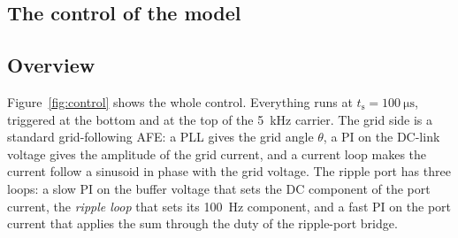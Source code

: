 \documentclass[11pt,a4paper]{scrartcl}
\newcommand{\ped}[1]{_{\mathrm{#1}}}
\begin{document}
\begin{onehalfspace}
\section{The control of the model}
\label{sec:control}

\subsection{Overview}

Figure~\ref{fig:control} shows the whole control. Everything runs at $t\ped{s} = \SI{100}{\micro\second}$, triggered at the bottom and at the top of the \SI{5}{\kilo\hertz} carrier. The grid side is a standard grid-following AFE: a PLL gives the grid angle $\theta$, a PI on the DC-link voltage gives the amplitude of the grid current, and a current loop makes the current follow a sinusoid in phase with the grid voltage. The ripple port has three loops: a slow PI on the buffer voltage that sets the DC component of the port current, the \emph{ripple loop} that sets its \SI{100}{\hertz} component, and a fast PI on the port current that applies the sum through the duty of the ripple-port bridge.


\end{onehalfspace}
\end{document}
